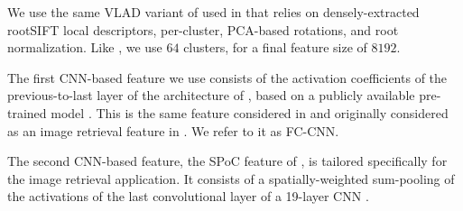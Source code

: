 We use the same VLAD variant of \cite{Delhumeau2013} used in \cite{ZePe15} that relies on densely-extracted rootSIFT \cite{3things} local descriptors, per-cluster, PCA-based rotations, and root normalization. Like \cite{ZePe15}, we use $64$ clusters, for a final feature size of $8192$.

The first CNN-based feature we use consists of the activation coefficients of the previous-to-last layer of the architecture of \cite{Krizhevsky2012}, based on a publicly available pre-trained model \cite{jia2014caffe}. This is the same feature considered in \cite{ZePe15} and originally considered as an image retrieval feature in \cite{Sharif}. We refer to it as FC-CNN. 

The second CNN-based feature, the SPoC feature of \cite{babenko15}, is tailored specifically for the image retrieval application. It consists of a spatially-weighted sum-pooling of the activations of the last convolutional layer of a 19-layer CNN \cite{Simonyan2014}.



